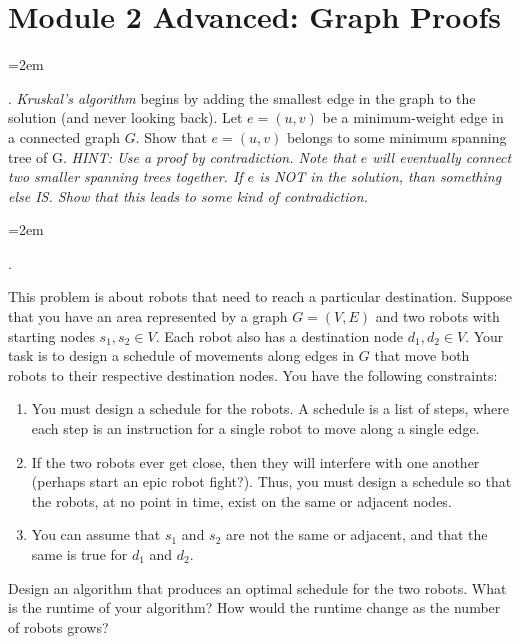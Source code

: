 \documentclass[12pt]{article}
\def\homework{Module 2 Advanced: Graph Proofs}
\newcounter{quesnum}
\newcommand{\question}[2][??]{
\begin{list}{\labelitemi}{\leftmargin=2em}
\item [\arabic{quesnum}.] {#2}
\end{list}
\addtocounter{quesnum}{1}
}
\begin{document}
\section*{\homework}




\question[1]{
\emph{Kruskal's algorithm} begins by adding the smallest edge in the graph to the solution (and never looking back). Let $e=(u,v)$ be a minimum-weight edge in a connected graph $G$. Show that $e=(u,v)$ belongs to some minimum spanning tree of G. \emph{HINT: Use a proof by contradiction. Note that $e$ will eventually connect two smaller spanning trees together. If $e$ is NOT in the solution, than something else IS. Show that this leads to some kind of contradiction.}
}




\question[3]{
This problem is about robots that need to reach a particular destination. Suppose that you have an area represented by a graph $G = (V,E)$ and two robots with starting nodes $s_1, s_2 \in V$. Each robot also has a destination node $d_1,d_2 \in V$. Your task is to design a schedule of movements along edges in $G$ that move both robots to their respective destination nodes. You have the following constraints:

\begin{enumerate}
\item You must design a schedule for the robots. A schedule is a list of steps, where each step is an instruction for a single robot to move along a single edge.
\item If the two robots ever get close, then they will interfere with one another (perhaps start an epic robot fight?). Thus, you must design a schedule so that the robots, at no point in time, exist on the same or adjacent nodes.
\item You can assume that $s_1$ and $s_2$ are not the same or adjacent, and that the same is true for $d_1$ and $d_2$.
\end{enumerate}

Design an algorithm that produces an optimal schedule for the two robots. What is the runtime of your algorithm? How would the runtime change as the number of robots grows?
}
\end{document}

